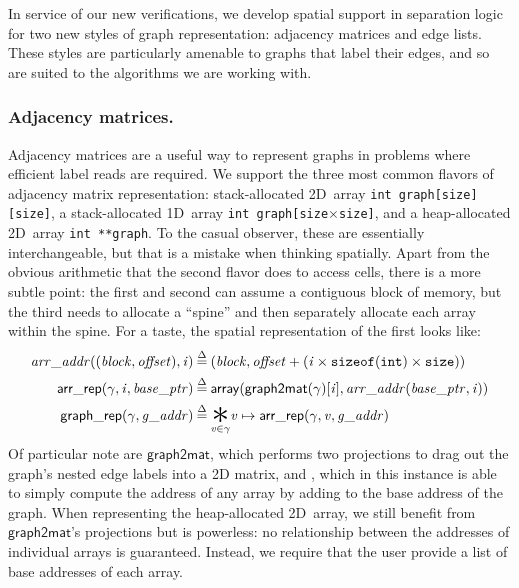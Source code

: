 In service of our new verifications, we develop spatial support in separation 
logic for two new styles of graph representation:
adjacency matrices and edge lists. These styles are particularly
amenable to graphs that label their edges, and so are suited to
the algorithms we are working with.


\subsubsection{Adjacency matrices.}

Adjacency matrices are a useful way to represent graphs
in problems where efficient label reads are required. 
We support the three most common 
flavors of adjacency matrix representation:
stack-allocated 2D~array \texttt{int~graph[size][size]},
a stack-allocated 1D~array \texttt{int~graph[size$\times$size]}, 
and a heap-allocated 2D~array \texttt{int~**graph}. 
To the casual observer, these are essentially interchangeable, but 
that is a mistake when thinking spatially. Apart from the obvious 
arithmetic that the second flavor does to access cells, there is a 
more subtle point: the first and second can
assume a contiguous block of memory, but the third needs to allocate
a ``spine'' and then separately allocate each array within the spine.
For a taste, the spatial representation of the first looks like:
\vspace{-0.5em}
\begin{equation*}
\begin{split}
\m{arr\_addr} ((\m{block}, \m{offset}), \m{i}) &\defeq
  (\m{block}, \m{offset} + (\m{i} \times \texttt{sizeof}(\texttt{int}) \times \texttt{size})) \\
\p{arr\_rep}(\gamma, \m{i}, \m{base\_ptr}) &\defeq \mathsf{array}(\mathsf{graph2mat}(\gamma)[\m{i}], \m{arr\_addr}(\m{base\_ptr}, \m{i})) \\
\vspace{1em}
\p{graph\_rep}(\gamma, \m{g\_addr}) &\defeq \underset{\m{v} \in \gamma}{\bigstar} \m{v}  \mapsto\p{arr\_rep}(\gamma, \m{v}, \m{g\_addr})
\end{split}
\end{equation*}
Of particular note are $\mathsf{graph2mat}$, which performs two projections to
drag out the graph's nested edge labels into a 2D matrix, and 
, which in this instance is able to simply compute
the address of any array  by adding to the base address of the graph.
When representing the heap-allocated 2D~array, we still benefit from 
$\mathsf{graph2mat}$'s projections but  is powerless: no relationship
between the addresses of individual arrays is guaranteed.
Instead, we require that the user provide a list of base addresses
of each array. 

